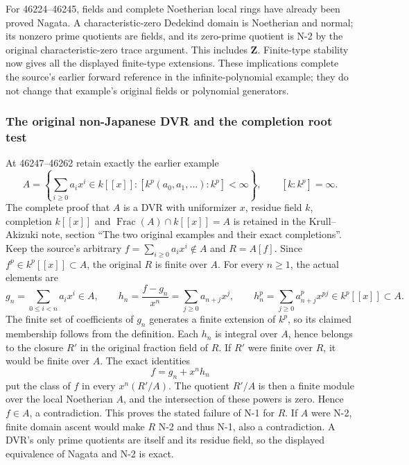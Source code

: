 For 46224--46245, fields and complete Noetherian local rings have already been proved Nagata. A characteristic-zero Dedekind domain is Noetherian and normal; its nonzero prime quotients are fields, and its zero-prime quotient is N-2 by the original characteristic-zero trace argument. This includes \(\mathbf Z\). Finite-type stability now gives all the displayed finite-type extensions. These implications complete the source's earlier forward reference in the infinite-polynomial example; they do not change that example's original fields or polynomial generators.

\subsubsection{The original non-Japanese DVR and the completion root test}\label{algebra-proof-067-the-original-non-japanese-dvr-and-the-completion-root-test}

At 46247--46262 retain exactly the earlier example \[
 A=\left\{\sum_{i\geq0}a_i x^i\in k[[x]]:
 [k^p(a_0,a_1,\ldots):k^p]<\infty\right\},
 \qquad [k:k^p]=\infty.
\] The complete proof that \(A\) is a DVR with uniformizer \(x\), residue field \(k\), completion \(k[[x]]\) and \(\operatorname{Frac}(A)\cap k[[x]]=A\) is retained in the Krull--Akizuki note, section ``The two original examples and their exact completions''. Keep the source's arbitrary \(f=\sum_{i\geq0}a_i x^i\notin A\) and \(R=A[f]\). Since \(f^p\in k^p[[x]]\subset A\), the original \(R\) is finite over \(A\). For every \(n\geq1\), the actual elements are \[
 g_n=\sum_{0\leq i<n}a_i x^i\in A,
 \qquad h_n=\frac{f-g_n}{x^n}=\sum_{j\geq0}a_{n+j}x^j,
 \qquad h_n^p=\sum_{j\geq0}a_{n+j}^{p}x^{pj}\in k^p[[x]]\subset A.
\] The finite set of coefficients of \(g_n\) generates a finite extension of \(k^p\), so its claimed membership follows from the definition. Each \(h_n\) is integral over \(A\), hence belongs to the closure \(R'\) in the original fraction field of \(R\). If \(R'\) were finite over \(R\), it would be finite over \(A\). The exact identities \[
 f=g_n+x^n h_n
\] put the class of \(f\) in every \(x^n(R'/A)\). The quotient \(R'/A\) is then a finite module over the local Noetherian \(A\), and the intersection of these powers is zero. Hence \(f\in A\), a contradiction. This proves the stated failure of N-1 for \(R\). If \(A\) were N-2, finite domain ascent would make \(R\) N-2 and thus N-1, also a contradiction. A DVR's only prime quotients are itself and its residue field, so the displayed equivalence of Nagata and N-2 is exact.


